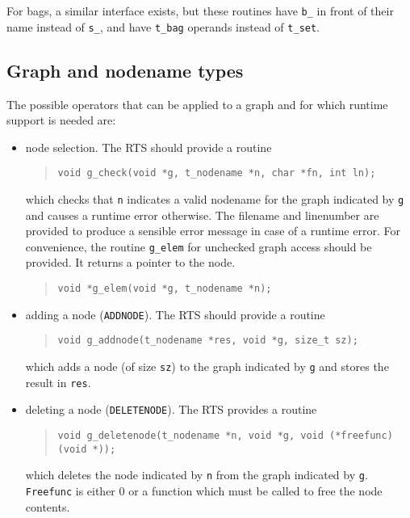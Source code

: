 \documentclass[10pt]{article}
\begin{document}
For bags, a similar interface exists, but these routines have \verb+b_+
in front of their name instead of \verb+s_+, and have \verb+t_bag+
operands instead of \verb+t_set+.

\subsection{Graph and nodename types}
The possible operators that can be applied to a graph and for which runtime
support is needed are:
\begin{itemize}
\item
node selection.
The RTS should provide a routine
\begin{quote}
\begin{verbatim}
void g_check(void *g, t_nodename *n, char *fn, int ln);
\end{verbatim}
\end{quote}
which checks that \verb+n+ indicates
a valid nodename for the graph indicated by \verb+g+ and causes a runtime
error otherwise.
The filename and linenumber are provided to produce a sensible error message
in case of a runtime error.
For convenience, the routine \verb+g_elem+
for unchecked graph access
should be provided. It returns a pointer to the node.
\begin{quote}
\begin{verbatim}
void *g_elem(void *g, t_nodename *n);
\end{verbatim}
\end{quote}
\item
adding a node (\verb+ADDNODE+).
The RTS should provide a routine
\begin{quote}
\begin{verbatim}
void g_addnode(t_nodename *res, void *g, size_t sz);
\end{verbatim}
\end{quote}
which adds a node (of size \verb+sz+) to the graph indicated by \verb+g+
and stores the result in \verb+res+.
\item
deleting a node (\verb+DELETENODE+).
The RTS provides a routine
\begin{quote}
\begin{verbatim}
void g_deletenode(t_nodename *n, void *g, void (*freefunc)(void *));
\end{verbatim}
\end{quote}
which deletes the node indicated by \verb+n+ from the graph indicated
by \verb+g+.
\verb+Freefunc+
is either 0 or a function which must be called to free
the node contents.

\end{itemize}
\end{document}
